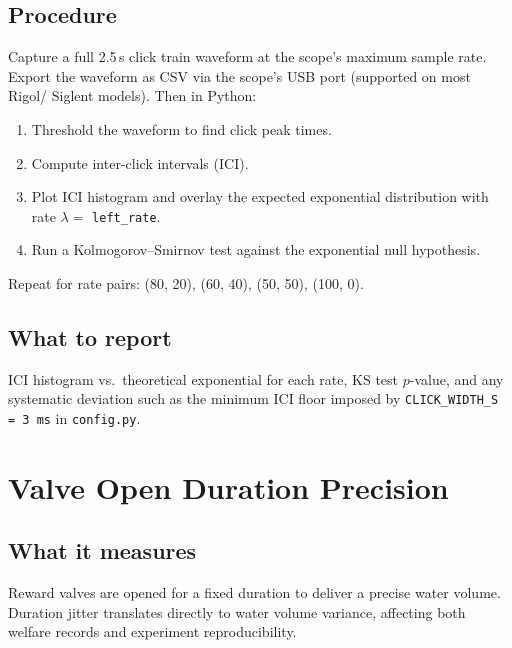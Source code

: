 \documentclass[11pt, a4paper]{article}
\begin{document}
\subsection*{Procedure}

Capture a full 2.5\,s click train waveform at the scope's maximum sample rate.
Export the waveform as CSV via the scope's USB port (supported on most Rigol/
Siglent models). Then in Python:

\begin{enumerate}[noitemsep]
    \item Threshold the waveform to find click peak times.
    \item Compute inter-click intervals (ICI).
    \item Plot ICI histogram and overlay the expected exponential distribution
          with rate $\lambda = $ \texttt{left\_rate}.
    \item Run a Kolmogorov--Smirnov test against the exponential null hypothesis.
\end{enumerate}

Repeat for rate pairs: (80, 20), (60, 40), (50, 50), (100, 0).

\subsection*{What to report}

ICI histogram vs.\ theoretical exponential for each rate, KS test $p$-value,
and any systematic deviation such as the minimum ICI floor imposed by
\texttt{CLICK\_WIDTH\_S = 3\,ms} in \texttt{config.py}.

\newpage

\section{Valve Open Duration Precision}

\subsection*{What it measures}

Reward valves are opened for a fixed duration to deliver a precise water
volume. Duration jitter translates directly to water volume variance, affecting
both welfare records and experiment reproducibility.
\end{document}
